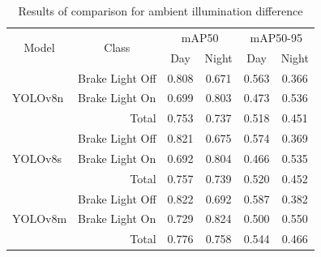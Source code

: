\begin{table}[!h]
    \caption{Results of comparison for ambient illumination difference}
    \label{tab:dayNnight}
    \renewcommand{\arraystretch}{0.94}
    \begin{tabular}{llcccc}
    \toprule
    \multicolumn{1}{c}{\multirow{2}{*}{Model}} & \multicolumn{1}{c}{\multirow{2}{*}{Class}} & \multicolumn{2}{c}{mAP50}                           & \multicolumn{2}{c}{mAP50-95}                        \\
    \multicolumn{1}{c}{}                       & \multicolumn{1}{c}{}                       & \multicolumn{1}{c}{Day} & \multicolumn{1}{c}{Night} & \multicolumn{1}{c}{Day} & \multicolumn{1}{c}{Night} \\
    \midrule
    \multirow{3}{*}{YOLOv8n}                   & Brake Light Off                            & 0.808          & 0.671               & 0.563          & 0.366                     \\
    & Brake Light On                             & 0.699                   & 0.803            & 0.473                   & 0.536            \\
    & \multicolumn{1}{r}{Total}                  & 0.753          & 0.737                     & 0.518          & 0.451                     \\

    \midrule
    \multirow{3}{*}{YOLOv8s}                   & Brake Light Off                            & 0.821          & 0.675                     & 0.574          & 0.369                     \\
    & Brake Light On                             & 0.692                   & 0.804            & 0.466                   & 0.535            \\
    & \multicolumn{1}{r}{Total}                  & 0.757          & 0.739                     & 0.520          & 0.452                     \\

    \midrule
    \multirow{3}{*}{YOLOv8m}                   & Brake Light Off                            & 0.822          & 0.692                     & 0.587          & 0.382                     \\
    & Brake Light On                             & 0.729                   & 0.824            & 0.500                   & 0.550            \\
    & \multicolumn{1}{r}{Total}                  & 0.776                   & 0.758                     & 0.544          & 0.466                     \\


\end{tabular}
\end{table}
